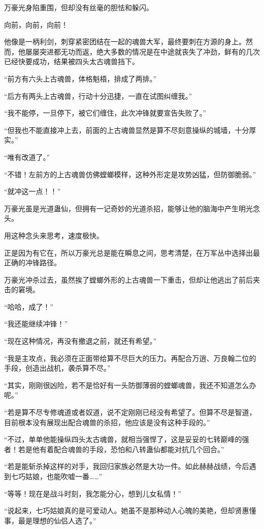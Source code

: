 \begin{this_body}
万豪光身陷重围，但却没有丝毫的胆怯和躲闪。

向前，向前，向前！

他像是一柄利剑，刺穿紧密团结在一起的魂兽大军，最终要刺在方源的身上。然而，他屡屡突进都无功而返，绝大多数的情况是在中途就丧失了冲劲，鲜有的几次已经快要成功，结果被四头太古魂兽挡下。

“前方有六头上古魂兽，体格魁梧，排成了两排。”

“后方有两头上古魂兽，行动十分迅捷，一直在试图纠缠我。”

“我不能停，一旦停下，被它们缠住，此次冲锋就要宣告失败了。”

“但我也不能直接冲上去，前面的上古魂兽显然是算不尽刻意操纵的城墙，十分厚实。”

“唯有改道了。”

“不错！左前方的上古魂兽仿佛螳螂模样，这种外形定是攻势凶猛，但防御脆弱。”

“就冲这一点！！”

万豪光虽是光道蛊仙，但拥有一记奇妙的光道杀招，能够让他的脑海中产生明光念头。

用这种念头来思考，速度极快。

正是因为有它在，所以万豪光总是能在瞬息之间，思考清楚，在万军丛中选择出最正确的冲锋路径。

万豪光冲杀过去，虽然挨了螳螂外形的上古魂兽一下重击，但却让他逃出了前后夹击的窘境。

“哈哈，成了！”

“我还能继续冲锋！”

“现在这种情况，再没有撤退之前，就还有希望。”

“我是主攻点，我必须在正面带给算不尽巨大的压力。再配合万逍、万良翰二位的手段，创造出战机，袭杀算不尽。”

“其实，刚刚很凶险，若不是恰好有一头防御薄弱的螳螂魂兽，我还不知道怎么办呢。”

“若是算不尽专修魂道或者奴道，说不定刚刚已经没有希望了。但算不尽是智道，目前根本没有展现出配合魂兽的杀招，他应该是没有这种手段的。”

“不过，单单他能操纵四头太古魂兽，就相当强悍了，这是妥妥的七转巅峰的强者！若是他有着配合魂兽的手段，恐怕和八转蛊仙都能对抗几个回合。”

“若是能斩杀掉这样的对手，我回归家族必然是大功一件。如此赫赫战绩，今后遇到七巧姑娘，也能吹嘘一番……”

“等等！现在是战斗时刻，我怎能分心，想到儿女私情！”

“说起来，七巧姑娘真的是可爱动人。她虽不是那种动人心魄的美艳，但却贤惠懂事，最是理想的仙侣人选了。”


\end{this_body}
